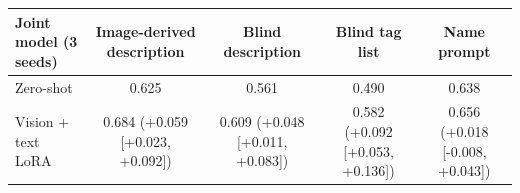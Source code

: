 \begin{tabular}{lcccc}\toprule Joint model (3 seeds) & Image-derived description & Blind description & Blind tag list & Name prompt\\\midrule
Zero-shot & 0.625 & 0.561 & 0.490 & 0.638\\
Vision + text LoRA & 0.684 (+0.059 [+0.023, +0.092]) & 0.609 (+0.048 [+0.011, +0.083]) & 0.582 (+0.092 [+0.053, +0.136]) & 0.656 (+0.018 [-0.008, +0.043])\\
\bottomrule\end{tabular}

